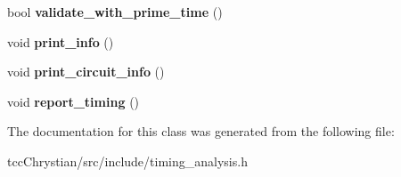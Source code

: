 \begin{DoxyCompactItemize}
\item 
\hypertarget{classTiming__Analysis_1_1Timing__Analysis_aa4220574cd239b38b7905636a6a4e43b}{bool {\bfseries validate\-\_\-with\-\_\-prime\-\_\-time} ()}\label{classTiming__Analysis_1_1Timing__Analysis_aa4220574cd239b38b7905636a6a4e43b}

\item 
\hypertarget{classTiming__Analysis_1_1Timing__Analysis_ad88fd0b79ae6d221a5691da10b0aa9e4}{void {\bfseries print\-\_\-info} ()}\label{classTiming__Analysis_1_1Timing__Analysis_ad88fd0b79ae6d221a5691da10b0aa9e4}

\item 
\hypertarget{classTiming__Analysis_1_1Timing__Analysis_a2c45b5a9fd71b7197a327593d54663a3}{void {\bfseries print\-\_\-circuit\-\_\-info} ()}\label{classTiming__Analysis_1_1Timing__Analysis_a2c45b5a9fd71b7197a327593d54663a3}

\item 
\hypertarget{classTiming__Analysis_1_1Timing__Analysis_a6d3fd296c18a72b05d36addc14068e16}{void {\bfseries report\-\_\-timing} ()}\label{classTiming__Analysis_1_1Timing__Analysis_a6d3fd296c18a72b05d36addc14068e16}

\end{DoxyCompactItemize}


The documentation for this class was generated from the following file\-:\begin{DoxyCompactItemize}
\item 
tcc\-Chrystian/src/include/timing\-\_\-analysis.\-h\end{DoxyCompactItemize}
